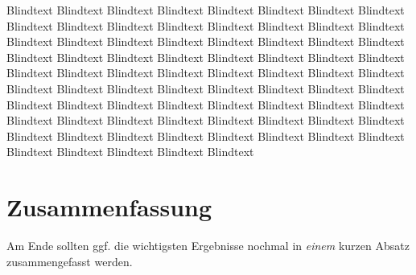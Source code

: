 Blindtext Blindtext Blindtext Blindtext Blindtext Blindtext Blindtext
Blindtext Blindtext Blindtext Blindtext Blindtext Blindtext Blindtext
Blindtext Blindtext Blindtext Blindtext Blindtext Blindtext Blindtext
Blindtext Blindtext Blindtext Blindtext Blindtext Blindtext Blindtext
Blindtext Blindtext Blindtext Blindtext Blindtext Blindtext Blindtext
Blindtext Blindtext Blindtext Blindtext Blindtext Blindtext Blindtext
Blindtext Blindtext Blindtext Blindtext Blindtext Blindtext Blindtext
Blindtext Blindtext Blindtext Blindtext Blindtext Blindtext Blindtext
Blindtext Blindtext Blindtext Blindtext Blindtext Blindtext Blindtext
Blindtext Blindtext Blindtext Blindtext Blindtext Blindtext Blindtext
Blindtext Blindtext Blindtext Blindtext Blindtext Blindtext Blindtext
\section{Zusammenfassung}
\label{ch:Analyse:sec:zusammenfassung}

Am Ende sollten ggf. die wichtigsten Ergebnisse nochmal in \emph{einem}
kurzen Absatz zusammengefasst werden.

